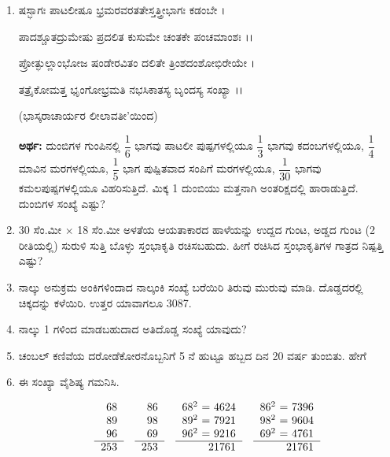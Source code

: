 \begin{enumerate}
\item ಷಸ್ಭಾಗಃ ಪಾಟಲೀಷೂ ಭ್ರಮರವರತತೇಸ್ತತ್ತ್ರೀಭಾಗಃ ಕಡಂಬೇ ।

ಪಾದಶ್ಚೂತದ್ರುಮೇಷು ಪ್ರದಲಿತ ಕುಸುಮೇ ಚಂತಕೇ ಪಂಚಮಾಂಶಃ ।।

ಪ್ರೋತ್ಫುಲ್ಲಾಂಭೋಜ ಷಂಡೇರವಿತಂ ದಲಿತೇ ತ್ರಿಂಶದಂಶೋಭಿರೇಯೇ । 

ತತ್ರೈಕೋಮತ್ತ ಭೃಂಗೋಭ್ರಮತಿ ನಭಸಿಕಾತಸ್ಯ ಬೃಂದಸ್ಯ ಸಂಖ್ಯಾ ।।

\hfill (ಭಾಸ್ಕರಾಚಾರ್ಯರ ಲೀಲಾವತೀ'ಯಿಂದ)

{\bf ಅರ್ಥ:} ದುಂಬಿಗಳ ಗುಂಪಿನಲ್ಲಿ $\dfrac{1}{6}$ ಭಾಗವು ಪಾಟಲೀ ಪುಷ್ಪಗಳಲ್ಲಿಯೂ $\dfrac{1}{3}$ ಭಾಗವು ಕದಂಬಗಳಲ್ಲಿಯೂ, $\dfrac{1}{4}$ ಮಾವಿನ ಮರಗಳಲ್ಲಿಯೂ, $\dfrac{1}{5}$ ಭಾಗ ಪುಷ್ಪಿತವಾದ ಸಂಪಿಗೆ  ಮರಗಳಲ್ಲಿಯೂ, $\dfrac{1}{30}$ ಭಾಗವು ಕಮಲಪುಷ್ಪಗಳಲ್ಲಿಯೂ ವಿಹರಿಸುತ್ತಿದೆ. ಮಿಕ್ಕ 1 ದುಂಬಿಯು ಮತ್ತನಾಗಿ ಅಂತರಿಕ್ಷದಲ್ಲಿ ಹಾರಾಡುತ್ತಿದೆ. ದುಂಬಿಗಳ ಸಂಖ್ಯೆ ಎಷ್ಟು? 

\item 30 ಸೆಂ.ಮೀ $\times $ 18 ಸೆಂ.ಮೀ ಅಳತೆಯ ಆಯತಾಕಾರದ ಹಾಳೆಯನ್ನು ಉದ್ದದ ಗುಂಟ, ಅಡ್ಡದ ಗುಂಟ (2 ರೀತಿಯಲ್ಲಿ) ಸುರುಳಿ ಸುತ್ತಿ ಬೊಳ್ಳು ಸ್ತಂಭಾಕೃತಿ ರಚಿಸಬಹುದು. ಹೀಗೆ ರಚಿಸಿದ ಸ್ತಂಭಾಕೃತಿಗಳ ಗಾತ್ರದ ನಿಷ್ಪತ್ತಿ ಎಷ್ಟು? 

\item ನಾಲ್ಕು ಅನುಕ್ರಮ ಅಂಕಿಗಳಿಂದಾದ ನಾಲ್ಕಂಕಿ ಸಂಖ್ಯೆ ಬರೆಯಿರಿ ತಿರುವು ಮುರುವು ಮಾಡಿ. ದೊಡ್ಡದರಲ್ಲಿ ಚಿಕ್ಕದನ್ನು ಕಳೆಯಿರಿ. ಉತ್ತರ ಯಾವಾಗಲೂ 3087. 

\item ನಾಲ್ಕು 1 ಗಳಿಂದ ಮಾಡಬಹುದಾದ ಅತಿದೊಡ್ಡ ಸಂಖ್ಯೆ ಯಾವುದು? 

\item ಚಂಬಲ್ ಕಣಿವೆಯ ದರೋಡೆಕೋರನೊಬ್ಬನಿಗೆ 5 ನೆ ಹುಟ್ಟೂ ಹಬ್ಬದ ದಿನ 20 ವರ್ಷ ತುಂಬಿತು. ಹೇಗೆ 

\item ಈ ಸಂಖ್ಯಾ ವೈಶಿಷ್ಯ ಗಮನಿಸಿ. 

\begin{equation*}
\begin{tabular}[t]{r}
68 \\
89\\
96\\\cline{1-1} 
253
\end{tabular}
\quad
\begin{tabular}[t]{r}
86\\ 
98\\
69\\\cline{1-1} 
253
\end{tabular}
\quad
\begin{tabular}[t]{r}
68$^{2}$ = 4624 \\
89$^{2}$ = 7921\\
96$^{2}$ = 9216\\\cline{1-1} 
\qquad 21761
\end{tabular}
\quad
\begin{tabular}[t]{r}
86$^{2}$ = 7396\\ 
98$^{2}$ = 9604\\
69$^{2}$ = 4761\\\cline{1-1} 
\qquad 21761
\end{tabular}
\end{equation*}
\end{enumerate}

